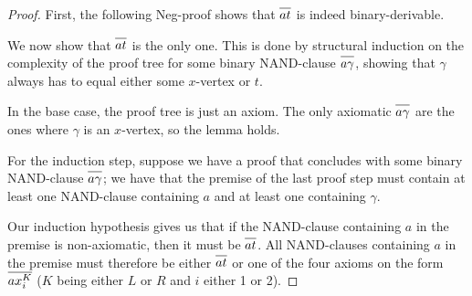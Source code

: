 \begin{proof}
First, the following Neg-proof shows that $\ol{at}$ is indeed binary-derivable.
\begin{figure}[!h]
  \centering
  \begin{prooftree*}[separation=0.8em, rule margin=1ex]
  \end{prooftree*}
  \caption{}
  \label{fig:at_binary_proof}
\end{figure}
\FloatBarrier
We now show that $\ol{at}$ is the only one.
This is done by structural induction on the complexity of the proof tree for some binary NAND-clause $\ol{a\gamma}$, showing that $\gamma$ always has to equal either some $x$-vertex or $t$.

In the base case, the proof tree is just an axiom.
The only axiomatic $\ol{a\gamma}$ are the ones where $\gamma$ is an $x$-vertex, so the lemma holds.

For the induction step, suppose we have a proof that concludes with some binary NAND-clause $\ol{a\gamma}$;
we have that the premise of the last proof step must contain at least one NAND-clause containing $a$ and at least one containing $\gamma$.

Our induction hypothesis gives us that if the NAND-clause containing $a$ in the premise is non-axiomatic, then it must be $\ol{at}$.
All NAND-clauses containing $a$ in the premise must therefore be either $\ol{at}$ or one of the four axioms on the form $\ol{ax^K_i}$ ($K$ being either $L$ or $R$ and $i$ either 1 or 2).


\end{proof}
